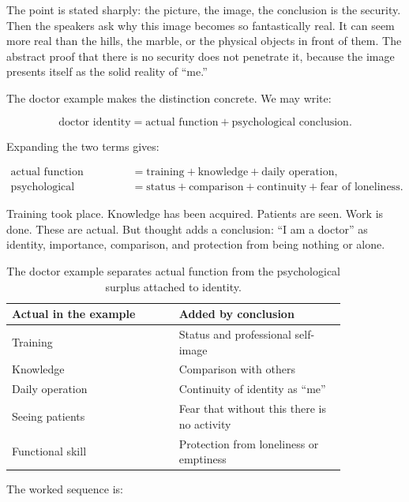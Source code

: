 The point is stated sharply: the picture, the image, the conclusion is the security. Then the speakers ask why this image becomes so fantastically real. It can seem more real than the hills, the marble, or the physical objects in front of them. The abstract proof that there is no security does not penetrate it, because the image presents itself as the solid reality of ``me.''

The doctor example makes the distinction concrete. We may write:

\begin{equation}
\text{doctor identity}
=
\text{actual function}
+
\text{psychological conclusion}.
\end{equation}

Expanding the two terms gives:

\begin{align}
\text{actual function}
&=
\text{training}
+
\text{knowledge}
+
\text{daily operation}, \\
\text{psychological conclusion}
&=
\text{status}
+
\text{comparison}
+
\text{continuity}
+
\text{fear of loneliness}.
\end{align}

Training took place. Knowledge has been acquired. Patients are seen. Work is done. These are actual. But thought adds a conclusion: ``I am a doctor'' as identity, importance, comparison, and protection from being nothing or alone.

\begin{table}
\centering
\begin{tabular}{|p{0.42\linewidth}|p{0.42\linewidth}|}
\hline
\textbf{Actual in the example} & \textbf{Added by conclusion} \\
\hline
Training & Status and professional self-image \\
\hline
Knowledge & Comparison with others \\
\hline
Daily operation & Continuity of identity as ``me'' \\
\hline
Seeing patients & Fear that without this there is no activity \\
\hline
Functional skill & Protection from loneliness or emptiness \\
\hline
\end{tabular}
\caption{The doctor example separates actual function from the psychological surplus attached to identity.}
\end{table}

The worked sequence is:

